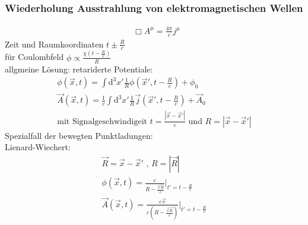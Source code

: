 \documentclass[a4paper]{article}
\newcommand*\dalembert{\mathop{}\!\mathbin\Box}
\begin{document}
\subsubsection{Wiederholung Ausstrahlung von elektromagnetischen Wellen}
\begin{align}
\dalembert A^\mu=\frac{4\pi}{c}j^\mu
\end{align}
Zeit und Raumkoordinaten $t\pm\frac{R}{c}$\\
für Coulombfeld $\phi\propto\frac{\chi(t-\frac{R}{c})}{R}$\\
allgmeine Lösung: retariderte Potentiale:\\
\begin{align}
\phi(\vec{x},t)=\int \mathrm{d}^3x' \frac{1}{R}\phi(\vec{x}',t-\frac{R}{c})+\phi_0\\
\vec{A}(\vec{x},t)=\frac{1}{c}\int \mathrm{d}^3x'
\frac{1}{R}\vec{j}(\vec{x}',t-\frac{R}{c})+\vec{A}_0\\
\text{mit Signalgeschwindigeit }t=\frac{|\vec{x}-\vec{x}'|}{c} \text{ und }
R=|\vec{x}-\vec{x}'|
\end{align}
Spezialfall der bewegten Punktladungen:\\
Lienard-Wiechert:
\begin{align}
\vec{R}=\vec{x}-\vec{x}' \text{ , } R=|\vec{R}|\\
\phi(\vec{x},t)=\frac{e}{R-\frac{\vec{v}\vec{R}}{c}}|_{t'=t-\frac{R}{c}}\\
\vec{A}(\vec{x},t)=\frac{e\vec{v}}{c(R-\frac{\vec{v}\vec{R}}{c})}|_{t'=t-\frac{R}{c}}
\end{align}
\end{document}
